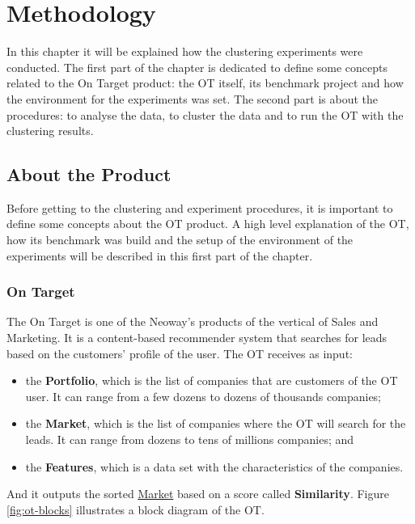 \chapter{Methodology}
\label{ch:methodology}

In this chapter it will be explained how the clustering experiments were conducted. The first part of the chapter is dedicated to define some concepts related to the On Target product: the OT itself, its benchmark project and how the environment for the experiments was set. The second part is about the procedures: to analyse the data, to cluster the data and to run the OT with the clustering results.

\section{About the Product}

Before getting to the clustering and experiment procedures, it is important to define some concepts about the OT product. A high level explanation of the OT, how its benchmark was build and the setup of the environment of the experiments will be described in this first part of the chapter.

\subsection{On Target}

The On Target is one of the Neoway's products of the vertical of Sales and Marketing. It is a content-based recommender system that searches for leads based on the customers' profile of the user. The OT receives as input:
\begin{itemize}
    \item the \textbf{Portfolio}, which is the list of companies that are customers of the OT user. It can range from a few dozens to dozens of thousands companies;
    \item the \textbf{Market}, which is the list of companies where the OT will search for the leads. It can range from dozens to tens of millions companies; and
    \item the \textbf{Features}, which is a data set with the characteristics of the companies.
\end{itemize}
And it outputs the sorted \underline{Market} based on a score called \textbf{Similarity}. Figure \ref{fig:ot-blocks} illustrates a block diagram of the OT.

